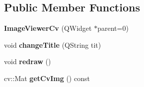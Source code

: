 \subsection*{Public Member Functions}
\begin{DoxyCompactItemize}
\item 
\hypertarget{class_image_viewer_cv_a2c186beb219fbee61574a2ed3b9a9170}{}{\bfseries Image\+Viewer\+Cv} (Q\+Widget $\ast$parent=0)\label{class_image_viewer_cv_a2c186beb219fbee61574a2ed3b9a9170}

\item 
\hypertarget{class_image_viewer_cv_a8e59a4aa80c802284a1ab4ebe156222e}{}void {\bfseries change\+Title} (Q\+String tit)\label{class_image_viewer_cv_a8e59a4aa80c802284a1ab4ebe156222e}

\item 
\hypertarget{class_image_viewer_cv_ab396718daaebb64c60262944a5e28755}{}void {\bfseries redraw} ()\label{class_image_viewer_cv_ab396718daaebb64c60262944a5e28755}

\item 
\hypertarget{class_image_viewer_cv_a117673bfa4d2b6c9245f2dafb131e8a0}{}cv\+::\+Mat {\bfseries get\+Cv\+Img} () const \label{class_image_viewer_cv_a117673bfa4d2b6c9245f2dafb131e8a0}

\end{DoxyCompactItemize}
